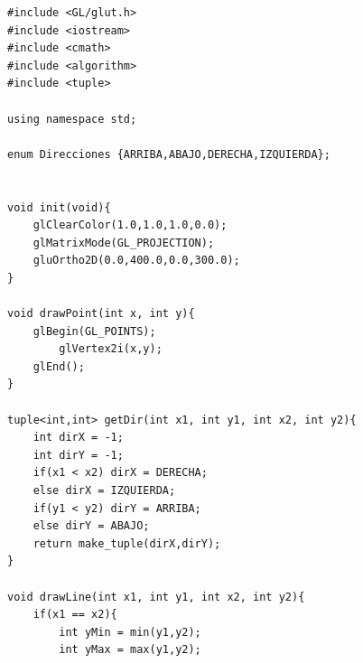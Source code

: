 \documentclass[a4paper,12pt]{article}
\begin{document}
\begin{lstlisting}
#include <GL/glut.h>
#include <iostream>
#include <cmath>
#include <algorithm>
#include <tuple>

using namespace std;

enum Direcciones {ARRIBA,ABAJO,DERECHA,IZQUIERDA};


void init(void){
    glClearColor(1.0,1.0,1.0,0.0);
    glMatrixMode(GL_PROJECTION);
    gluOrtho2D(0.0,400.0,0.0,300.0);
}

void drawPoint(int x, int y){
    glBegin(GL_POINTS);
        glVertex2i(x,y);
    glEnd();
}

tuple<int,int> getDir(int x1, int y1, int x2, int y2){
    int dirX = -1;
    int dirY = -1;
    if(x1 < x2) dirX = DERECHA;
    else dirX = IZQUIERDA;
    if(y1 < y2) dirY = ARRIBA;
    else dirY = ABAJO;
    return make_tuple(dirX,dirY);
}

void drawLine(int x1, int y1, int x2, int y2){
    if(x1 == x2){
        int yMin = min(y1,y2);
        int yMax = max(y1,y2);


\end{lstlisting}
\end{document}
